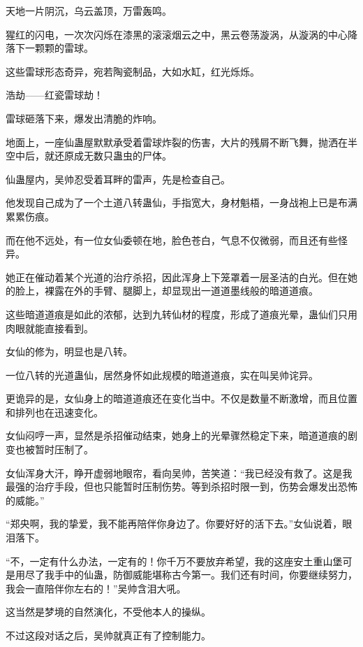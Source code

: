 
\begin{this_body}

天地一片阴沉，乌云盖顶，万雷轰鸣。

猩红的闪电，一次次闪烁在漆黑的滚滚烟云之中，黑云卷荡漩涡，从漩涡的中心降落下一颗颗的雷球。

这些雷球形态奇异，宛若陶瓷制品，大如水缸，红光烁烁。

浩劫——红瓷雷球劫！

雷球砸落下来，爆发出清脆的炸响。

地面上，一座仙蛊屋默默承受着雷球炸裂的伤害，大片的残屑不断飞舞，抛洒在半空中后，就还原成无数只蛊虫的尸体。

仙蛊屋内，吴帅忍受着耳畔的雷声，先是检查自己。

他发现自己成为了一个土道八转蛊仙，手指宽大，身材魁梧，一身战袍上已是布满累累伤痕。

而在他不远处，有一位女仙委顿在地，脸色苍白，气息不仅微弱，而且还有些怪异。

她正在催动着某个光道的治疗杀招，因此浑身上下笼罩着一层圣洁的白光。但在她的脸上，裸露在外的手臂、腿脚上，却显现出一道道墨线般的暗道道痕。

这些暗道道痕是如此的浓郁，达到九转仙材的程度，形成了道痕光晕，蛊仙们只用肉眼就能直接看到。

女仙的修为，明显也是八转。

一位八转的光道蛊仙，居然身怀如此规模的暗道道痕，实在叫吴帅诧异。

更诡异的是，女仙身上的暗道道痕还在变化当中。不仅是数量不断激增，而且位置和排列也在迅速变化。

女仙闷哼一声，显然是杀招催动结束，她身上的光晕骤然稳定下来，暗道道痕的剧变也被暂时压制了。

女仙浑身大汗，睁开虚弱地眼帘，看向吴帅，苦笑道：“我已经没有救了。这是我最强的治疗手段，但也只能暂时压制伤势。等到杀招时限一到，伤势会爆发出恐怖的威能。”

“郑央啊，我的挚爱，我不能再陪伴你身边了。你要好好的活下去。”女仙说着，眼泪落下。

“不，一定有什么办法，一定有的！你千万不要放弃希望，我的这座安土重山堡可是用尽了我手中的仙蛊，防御威能堪称古今第一。我们还有时间，你要继续努力，我会一直陪伴你左右的！”吴帅含泪大吼。

这当然是梦境的自然演化，不受他本人的操纵。

不过这段对话之后，吴帅就真正有了控制能力。


\end{this_body}
